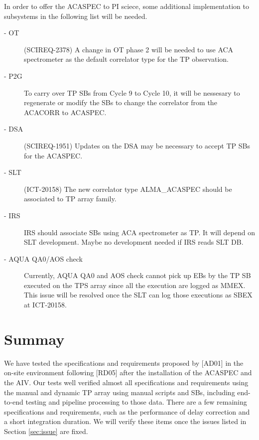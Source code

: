 In order to offer the ACASPEC to PI sciece, some additional implementation to subsystems in the following list will be needed.

\begin{description}
\item[- OT]  (SCIREQ-2378) A change in OT phase 2 will be needed to use ACA spectrometer as the default correlator type for the TP observation. 
\item[- P2G] To carry over TP SBs from Cycle 9 to Cycle 10, it will be nessesary to regenerate or modify the SBs to change the correlator from the ACACORR to ACASPEC.   
\item[- DSA] (SCIREQ-1951) Updates on the DSA may be necessary to accept TP SBs for the ACASPEC.
\item[- SLT] (ICT-20158) The new correlator type ALMA\_ACASPEC should be associated to TP array family.  
\item[- IRS] IRS should associate SBs using ACA spectrometer as TP. It will depend on SLT development. Maybe no development needed if IRS reads SLT DB.
\item[- AQUA QA0/AOS check] Currently, AQUA QA0 and AOS check cannot pick up EBs by the TP SB executed on the TPS array since all the execution are logged as MMEX. This issue will be resolved once the SLT can log those executions as SBEX at ICT-20158.
\end{description}

\section{Summay}
We have tested the specifications and requirements proposed by [AD01] in the on-site environment following [RD05] after the installation of the ACASPEC and the AIV. 
Our tests well verified almost all specifications and requirements using the manual and dynamic TP array using manual scripts and SBs, including end-to-end testing and pipeline processing to those data. There are a few remaining specifications and requirements, such as the performance of delay correction and a short integration duration. We will verify these items once the issues listed in Section \ref{sec:issue} are fixed.


\clearpage



